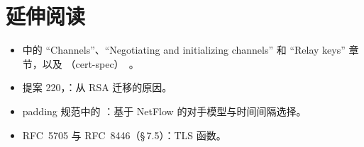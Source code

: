 \section*{延伸阅读}
\begin{itemize}
  \item {} 中的 \enquote{Channels}、\enquote{Negotiating and initializing channels} 和 \enquote{Relay keys} 章节，以及 （cert-spec）~\cite{torspec}。
  \item 提案 220，：从 RSA 迁移的原因。
  \item padding 规范中的 ：基于 NetFlow 的对手模型与时间间隔选择。
  \item RFC~5705 与 RFC~8446（§\,7.5）：TLS  函数。
\end{itemize}
